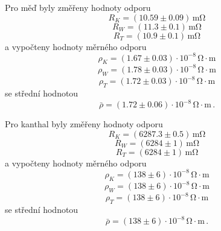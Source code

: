 \documentclass{../concepts/prepareprotokol} %
\begin{document}
Pro měď byly změřeny hodnoty odporu
\begin{equation*}
    R_K = (10.59 \pm 0.09) \, \si{\milli\ohm}
\end{equation*}
\begin{equation*}
    R_W = (11.3 \pm 0.1) \, \si{\milli\ohm}
\end{equation*}
\begin{equation*}
    R_T = (10.9 \pm 0.1) \, \si{\milli\ohm}
\end{equation*}
a vypočteny hodnoty měrného odporu
\begin{equation*}
    \rho_K = (1.67 \pm 0.03) \cdot 10^{-8} \, \mathrm{\Omega \cdot m}
\end{equation*}
\begin{equation*}
    \rho_W = (1.78 \pm 0.03) \cdot 10^{-8} \, \mathrm{\Omega \cdot m}
\end{equation*}
\begin{equation*}
    \rho_T = (1.72 \pm 0.03) \cdot 10^{-8} \, \mathrm{\Omega \cdot m}
\end{equation*}
se střední hodnotou
\begin{equation*}
    \bar{\rho} = (1.72 \pm 0.06) \cdot 10^{-8} \, \mathrm{\Omega \cdot m} \, .
\end{equation*}

Pro kanthal byly změřeny hodnoty odporu
\begin{equation*}
    R_K = (6287.3 \pm 0.5) \, \si{\milli\ohm}
\end{equation*}
\begin{equation*}
    R_W = (6284 \pm 1) \, \si{\milli\ohm}
\end{equation*}
\begin{equation*}
    R_T = (6284 \pm 1) \, \si{\milli\ohm}
\end{equation*}
a vypočteny hodnoty měrného odporu
\begin{equation*}
    \rho_K = (138 \pm 6) \cdot 10^{-8} \, \mathrm{\Omega \cdot m}
\end{equation*}
\begin{equation*}
    \rho_W = (138 \pm 6) \cdot 10^{-8} \, \mathrm{\Omega \cdot m}
\end{equation*}
\begin{equation*}
    \rho_T = (138 \pm 6) \cdot 10^{-8} \, \mathrm{\Omega \cdot m}
\end{equation*}
se střední hodnotou
\begin{equation*}
    \bar{\rho} = (138 \pm 6) \cdot 10^{-8} \, \mathrm{\Omega \cdot m} \, .
\end{equation*}
\end{document}
